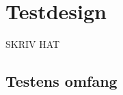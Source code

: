 \chapter{Testdesign}
\label{TestAfSkalaTestdesign}
%
SKRIV HAT
%
\section{Testens omfang}
\label{TestAfSkalaTestensOmfangValgAfGestikker}
%